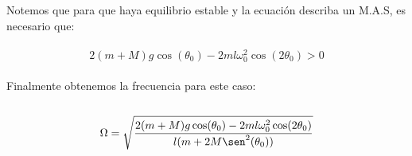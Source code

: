 \documentclass[11pt,letterpaper]{article}
\begin{document}
Notemos que para que haya equilibrio estable y la ecuaci\'on describa un M.A.S, es necesario que:\,\\
\,\\
\begin{equation*}
    2(m+M)g\cos(\theta_0)-2ml\omega_0^2\cos(2\theta_0)>0
\end{equation*}\,\\
Finalmente obtenemos la frecuencia para este caso:\,\\
\,\\
\begin{equation*}
    \Omega=\sqrt{\frac{2(m+M)g\cos(\theta_0)-2ml\omega^2_0\cos(2\theta_0)}{l(m+2M\sen^2(\theta_0))}}
\end{equation*}
\end{document}
